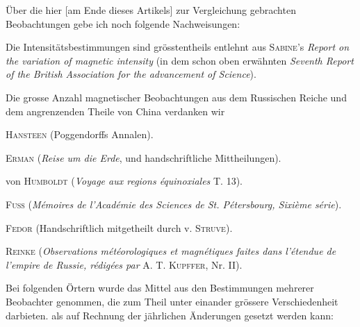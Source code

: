 Über die hier [am Ende dieses Artikels] zur Vergleichung gebrachten Beobachtungen gebe ich noch folgende Nachweisungen:

Die Intensitätsbestimmungen sind grösstentheils entlehnt aus \textsc{Sabine}'s \textit{Report on the variation of magnetic intensity} (in dem schon oben erwähnten \textit{Seventh Report of the British Association for the advancement of Science}).

Die grosse Anzahl magnetischer Beobachtungen aus dem Russischen Reiche und dem angrenzenden Theile von China verdanken wir

\noindent\hspace*{1em}\textsc{Hansteen} (Poggendorffs Annalen).\par
\noindent\hspace*{1em}\textsc{Erman} (\textit{Reise um die Erde}, und handschriftliche Mittheilungen).\par
\noindent\hspace*{1em}von \textsc{Humboldt} (\textit{Voyage aux regions équinoxiales} T. 13).\par
\par\clearpage
{}
\noindent\hspace*{1em}\textsc{Fuss} (\textit{Mémoires de l'Académie des Sciences de St. Pétersbourg, Sixième série}).\par
\noindent\hspace*{1em}\textsc{Fedor} (Handschriftlich mitgetheilt durch v. \textsc{Struve}).\par
\noindent\hspace*{1em}\textsc{Reinke} (\textit{Observations météorologiques et magnétiques faites dans l'étendue de l'empire de Russie, rédigées par} A. T. \textsc{Kupffer}, Nr. II).\par
Bei folgenden Örtern wurde das Mittel aus den Bestimmungen mehrerer Beobachter genommen, die zum Theil unter einander grössere Verschiedenheit darbieten. als auf Rechnung der jährlichen Änderungen gesetzt werden kann:

